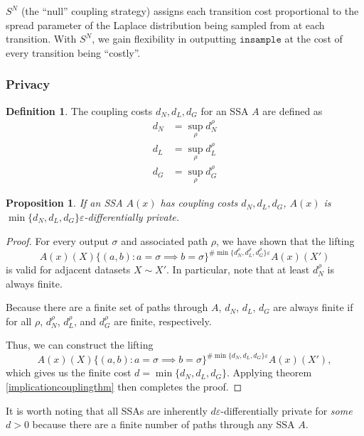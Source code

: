 \documentclass[12pt]{article}
\newtheorem{prop}[thm]{Proposition}
\theoremstyle{definition}
\newtheorem{defn}[thm]{Definition}
\begin{document}
$S^N$ (the ``null'' coupling strategy) assigns each transition cost proportional to the spread parameter of the Laplace distribution being sampled from at each transition. With $S^N$, we gain flexibility in outputting $\texttt{insample}$ at the cost of every transition being ``costly''.

\subsubsection{Privacy}

\begin{defn}
    The coupling costs $d_N, d_L, d_G$ for an SSA $A$ are defined as \begin{align*}
        d_N &= \sup_{\rho} d_N^\rho\\
        d_L &= \sup_{\rho} d_L^\rho\\
        d_G &= \sup_{\rho} d_G^\rho
    \end{align*}
\end{defn}


\begin{prop}
    If an SSA $A(x)$ has coupling costs $d_N, d_L, d_G$, $A(x)$ is \\
    $\min\{d_N, d_L, d_G\}\varepsilon$-differentially private. 
\end{prop}

\begin{proof}
    For every output $\sigma$ and associated path $\rho$, we have shown that the lifting \[A(x)(X)\{(a, b): a = \sigma \implies b=\sigma\}^{\#\min\{d_N^{\rho}, d_L^{\rho}, d_G^{\rho}\}\varepsilon}A(x)(X')\] is valid for adjacent datasets $X\sim X'$. In particular, note that at least $d_N^\rho$ is always finite. 
    
    Because there are a finite set of paths through $A$, $d_N$, $d_L$, $d_G$ are always finite if for all $\rho$, $d_N^\rho$, $d_L^\rho$, and $d_G^\rho$ are finite, respectively.
    
    Thus, we can construct the lifting \[A(x)(X)\{(a, b): a = \sigma \implies b=\sigma\}^{\#\min\{d_N, d_L, d_G\}\varepsilon}A(x)(X'),\]
    which gives us the finite cost $d = \min\{d_N, d_L, d_G\}$.
    Applying theorem \ref{implicationcouplingthm} then completes the proof.
\end{proof}

It is worth noting that all SSAs are inherently $d\varepsilon$-differentially private for \textit{some} $d > 0$ because there are a finite number of paths through any SSA $A$.
\end{document}

